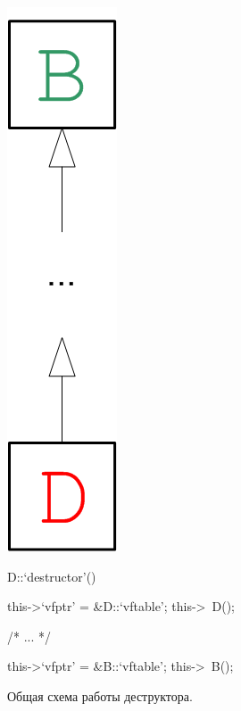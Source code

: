 \begin{figure}[htb!]
\hspace{2cm}
\begin{minipage}[t]{0.1\textwidth}
\vspace{0pt}
\raggedleft
\includegraphics[scale=0.8]{images/destructor.png}
\end{minipage}
\hspace{0.5cm}
\begin{minipage}[t]{0.4\textwidth}
\vspace{0pt}
\raggedright
\begin{cplusplus}[emph={D}, emphstyle=\color{red}, emph={[2]B}, emphstyle={[2]\color{mygreen}}]
D::`destructor'() {
  this->`vfptr' = &D::`vftable';
  this->~D();

  /* ... */

  this->`vfptr' = &B::`vftable';
  this->~B();
}
\end{cplusplus}
\end{minipage}
\caption{Общая схема работы деструктора.}
\label{listing:destructor}
\end{figure}

